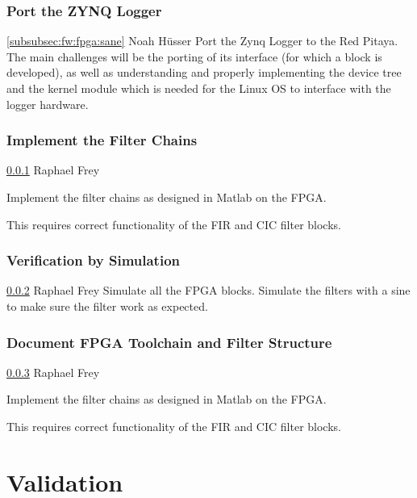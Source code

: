 \documentclass[a4paper,oneside]{alpenspecs/alpenspecs}
\begin{document}
\subsubsection{Port the ZYNQ Logger}
\label{subsubsec:fw:fpga:logger}
\wpac
    {}
    {}
    {}
    {\ref{subsubsec:fw:fpga:sane}}
    {}
    {Noah H\"usser}
    {%
        Port the Zynq Logger to the Red Pitaya. The main challenges will be
        the porting of its interface (for which a block 
        is developed), as well as understanding and properly implementing the
        device tree and the kernel module which is needed for the Linux OS
        to interface with the logger hardware.
    }

\subsubsection{Implement the Filter Chains}
\label{subsubsec:fw:fpga:filters}
\wpac
    {}
    {}
    {}
    {\ref{subsubsec:fw:fpga:logger}}
    {}
    {Raphael Frey}
    {%
        Implement the filter chains as designed in Matlab on the FPGA.

        This requires correct functionality of the FIR and CIC filter
        blocks.
    }

\subsubsection{Verification by Simulation}
\label{subsubsec:fw:fpga:sim}
\wpac
    {}
    {}
    {}
    {\ref{subsubsec:fw:fpga:filters}}
    {}
    {Raphael Frey}
    {%
        Simulate all the FPGA blocks.
        Simulate the filters with a sine to make sure the filter work as expected.
    }

\subsubsection{Document FPGA Toolchain and Filter Structure}
\label{subsubsec:fw:fpga:doc}
\wpac
    {}
    {}
    {}
    {\ref{subsubsec:fw:fpga:sim}}
    {}
    {Raphael Frey}
    {%
        Implement the filter chains as designed in Matlab on the FPGA.

        This requires correct functionality of the FIR and CIC filter
        blocks.
    }

\section{Validation}
\label{sec:validation}
\end{document}
